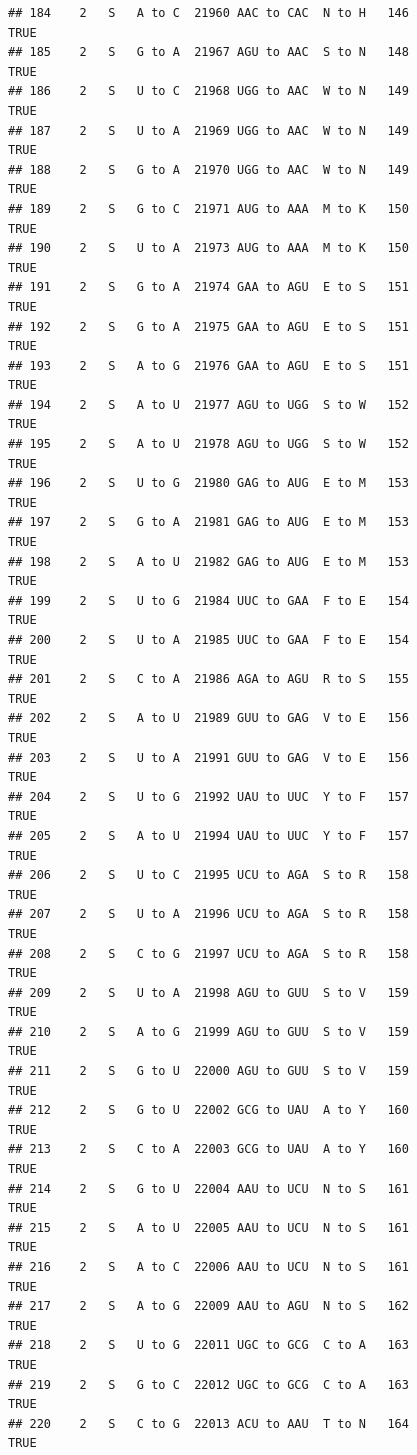 \documentclass[
  12pt,
]{article}
\begin{document}
\begin{verbatim}
## 184    2   S   A to C  21960 AAC to CAC  N to H   146           TRUE
## 185    2   S   G to A  21967 AGU to AAC  S to N   148           TRUE
## 186    2   S   U to C  21968 UGG to AAC  W to N   149           TRUE
## 187    2   S   U to A  21969 UGG to AAC  W to N   149           TRUE
## 188    2   S   G to A  21970 UGG to AAC  W to N   149           TRUE
## 189    2   S   G to C  21971 AUG to AAA  M to K   150           TRUE
## 190    2   S   U to A  21973 AUG to AAA  M to K   150           TRUE
## 191    2   S   G to A  21974 GAA to AGU  E to S   151           TRUE
## 192    2   S   G to A  21975 GAA to AGU  E to S   151           TRUE
## 193    2   S   A to G  21976 GAA to AGU  E to S   151           TRUE
## 194    2   S   A to U  21977 AGU to UGG  S to W   152           TRUE
## 195    2   S   A to U  21978 AGU to UGG  S to W   152           TRUE
## 196    2   S   U to G  21980 GAG to AUG  E to M   153           TRUE
## 197    2   S   G to A  21981 GAG to AUG  E to M   153           TRUE
## 198    2   S   A to U  21982 GAG to AUG  E to M   153           TRUE
## 199    2   S   U to G  21984 UUC to GAA  F to E   154           TRUE
## 200    2   S   U to A  21985 UUC to GAA  F to E   154           TRUE
## 201    2   S   C to A  21986 AGA to AGU  R to S   155           TRUE
## 202    2   S   A to U  21989 GUU to GAG  V to E   156           TRUE
## 203    2   S   U to A  21991 GUU to GAG  V to E   156           TRUE
## 204    2   S   U to G  21992 UAU to UUC  Y to F   157           TRUE
## 205    2   S   A to U  21994 UAU to UUC  Y to F   157           TRUE
## 206    2   S   U to C  21995 UCU to AGA  S to R   158           TRUE
## 207    2   S   U to A  21996 UCU to AGA  S to R   158           TRUE
## 208    2   S   C to G  21997 UCU to AGA  S to R   158           TRUE
## 209    2   S   U to A  21998 AGU to GUU  S to V   159           TRUE
## 210    2   S   A to G  21999 AGU to GUU  S to V   159           TRUE
## 211    2   S   G to U  22000 AGU to GUU  S to V   159           TRUE
## 212    2   S   G to U  22002 GCG to UAU  A to Y   160           TRUE
## 213    2   S   C to A  22003 GCG to UAU  A to Y   160           TRUE
## 214    2   S   G to U  22004 AAU to UCU  N to S   161           TRUE
## 215    2   S   A to U  22005 AAU to UCU  N to S   161           TRUE
## 216    2   S   A to C  22006 AAU to UCU  N to S   161           TRUE
## 217    2   S   A to G  22009 AAU to AGU  N to S   162           TRUE
## 218    2   S   U to G  22011 UGC to GCG  C to A   163           TRUE
## 219    2   S   G to C  22012 UGC to GCG  C to A   163           TRUE
## 220    2   S   C to G  22013 ACU to AAU  T to N   164           TRUE

\end{verbatim}
\end{document}
